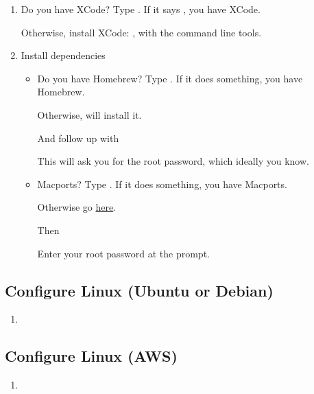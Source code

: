 \begin{enumerate}
\item Do you have XCode?  Type .  If it says , you have XCode.

Otherwise, install XCode: , with the
command line tools.
\item Install dependencies

\begin{itemize}
\item Do you have Homebrew?  Type .  If it does something, you have Homebrew.

Otherwise, 
will install it.

And follow up with 

This will ask you for the root password, which ideally you know.
\item Macports? Type .  If it does something, you have Macports.

Otherwise go \href{http://www.macports.org/install.php}{here}.

Then 

Enter your root password at the prompt.
\end{itemize}
\end{enumerate}

\subsection{Configure Linux (Ubuntu or Debian)}

\begin{enumerate}
\item {}
\end{enumerate}

\subsection{Configure Linux (AWS)}

\begin{enumerate}
\item {}
\end{enumerate}

